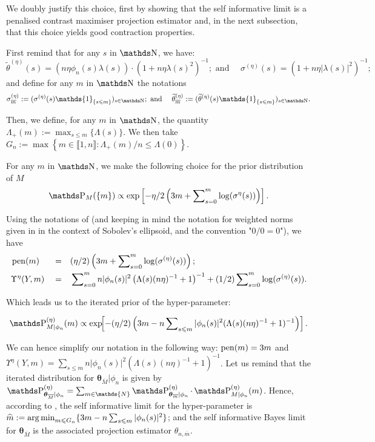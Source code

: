 We doubly justify this choice, first by showing that the self informative limit is a penalised contrast maximiser projection estimator and, in the next subsection, that this choice yields good contraction properties.

\medskip

First remind that for any $s$ in $\N$, we have:
\[\widetilde{\theta}^{(\eta)}(s) = (n \eta \phi_{n}(s) \lambda(s)) \cdot (1 + n \eta \lambda(s)^{2})^{-1}; \text{ and }\quad \sigma^{(\eta)}(s) = (1 + n \eta \vert \lambda(s)\vert^{2})^{-1};\]
and define for any $m$ in $\N$ the notations
\[\sigma^{(\eta)}_{\overline{m}} := (\sigma^{(\eta)}(s) \mathds{1}_{\{s \leq m\}})_{s \in \N}; \text{ and }\quad \widetilde{\theta}^{(\eta)}_{\overline{m}} := (\widetilde{\theta}^{(\eta)}(s) \mathds{1}_{\{ s \leq m\}})_{s \in \N}.\]

Then, we define, for any $m$ in $\N$, the quantity $\Lambda_{+}(m) := \max_{ s \leq m} \{\Lambda(s)\}$.
We then take $G_{n} := \max\left\{m \in \llbracket 1, n \rrbracket : \Lambda_{+}(m) / n \leq \Lambda(0)\right\}$.

For any $m$ in $\N$, we make the following choice for the prior distribution of $M$
\[\P_{M}(\{m\}) \propto \exp\left[-\eta/2 \left(3 m + \sum\nolimits_{s = 0}^{m} \log(\sigma^{\eta}(s))\right) \right].\]

Using the notations of  (and keeping in mind the notation for weighted norms given in  in the context of Sobolev's ellipsoid, and the convention "$0/0 = 0$"), we have 
\begin{alignat*}{3}
& \operatorname{pen}(m) && = && (\eta/2)\left(3 m + \sum\nolimits_{s = 0}^{m} \log(\sigma^{(\eta)}(s))\right);\\
& \Upsilon^{\eta}(Y, m) && = && \sum\nolimits_{s = 0}^{m} n \vert \phi_{n}(s) \vert^{2}\left(\Lambda(s)(n \eta)^{-1} + 1\right)^{-1} + (1/2) \sum\nolimits_{s = 0}^{m} \log(\sigma^{(\eta)}(s)).
\end{alignat*}

Which leads us to the iterated prior of the hyper-parameter:

\[\P_{M \vert \phi_{n}}^{(\eta)}(m) \propto \exp\!\!\left[- (\eta/2)\left( 3 m - n \sum\nolimits_{s \leq m} \vert 
\phi_{n}(s)\vert^{2}(\Lambda(s)(n \eta)^{-1} + 1)^{-1} \right) \right].\]

We can hence simplify our notation in the following way: $\operatorname{pen}(m) = 3 m$ and $\Upsilon^{\eta}(Y, m) = \sum\nolimits_{s \leq m} n \vert \phi_{n}(s) \vert^{2}(\Lambda(s)(n \eta)^{-1} + 1)^{-1}$.
Let us remind that the iterated distribution for $\boldsymbol{\theta}_{\overline{M}}\vert \phi_{n}$ is given by $\P_{\boldsymbol{\theta}_{\overline{M}} \vert \phi_{n}}^{(\eta)} = \sum\nolimits_{m \in \mathds{N}}\P_{\boldsymbol{\theta}_{\overline{m}} \vert \phi_{n}}^{(\eta)} \cdot \P_{M \vert \phi_{n}}^{(\eta)}(m)$.
Hence, according to , the self informative limit for the hyper-parameter is $\widehat{m} := \operatorname*{arg\,min}_{m \leqslant G_{n}} \{3 m - n \sum\nolimits_{s \leqslant m}\vert \phi_{n}(s) \vert^{2}\}$; and the self informative Bayes limit for $\boldsymbol{\theta}_{\overline{M}}$ is the associated projection estimator $\theta_{n, \overline{m}}$.


